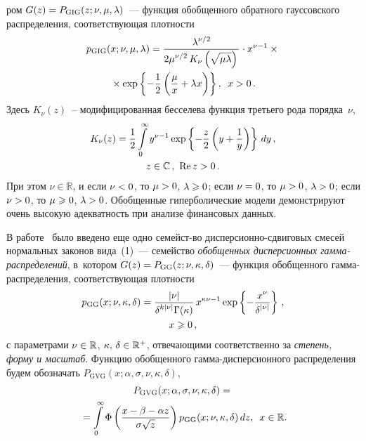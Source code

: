 \begin{multicols}{2}
\pagebreak

\noindent
ром $G(z)\hm=P_{\mathrm{GIG}}(z;\nu,\mu,\lambda)$~---
функция обобщенного обратного гауссовского распределения,
соответствующая плотности
\begin{multline*}
p_{\mathrm{GIG}}(x;\nu,\mu,\lambda)=\displaystyle\frac{\displaystyle \lambda^{\nu/2}\mathstrut}{\displaystyle 2\mu^{\nu/2}\,
K_{\nu}\left(\sqrt{\mu\lambda}\right)\mathstrut}\cdot
x^{\nu-1}\times{}\\
{}\times\exp\left\{-\displaystyle\frac{\displaystyle 1\mathstrut}{\displaystyle 2\mathstrut}\left(\displaystyle\frac{\displaystyle \mu\mathstrut}{\displaystyle x\mathstrut}+\lambda
x\right)\right\},\enskip x>0\,.
\end{multline*}
Здесь $K_{\nu}(z)$~-- модифицированная бесселева функция третьего
рода порядка~$\nu$,
\begin{multline*}
K_{\nu}(z)=\displaystyle\frac{\displaystyle 1\mathstrut}{\displaystyle 2\mathstrut}\int\limits_{0}^{\infty}
y^{\nu-1}\exp\left\{-\displaystyle\frac{\displaystyle z\mathstrut}{\displaystyle 2\mathstrut}\left(y+\displaystyle\frac{\displaystyle 1\mathstrut}{\displaystyle y\mathstrut}\right)\right\}\,dy\,,\\
z\in\mathbb{C}\,,\ \mathrm{Re}\,z>0\,.
\end{multline*}
При этом $\nu\in\mathbb{R}$, и если $\nu\hm<0$, то $\mu\hm>0$, $\lambda\hm\geqslant0$; если
$\nu\hm=0$, то $\mu\hm>0$, $\lambda\hm>0$; если $\nu\hm>0$, то $\mu\hm\geqslant0$,
$\lambda\hm>0$. Обобщенные гиперболические модели демонстрируют очень
высокую адекватность при анализе финансовых данных.

В работе~\cite{KorolevSokolov2012} было введено еще одно семейст-\linebreak во
дис\-пер\-си\-он\-но-сдви\-го\-вых смесей нормальных \mbox{законов} вида~(1)~---
семейство {\it обобщенных дис\-пер\-си\-он\-ных гам\-ма-рас\-пре\-де\-ле\-ний}, 
в~котором $G(z)\hm=P_{\mathrm{GG}}(z;\nu,\kappa,\delta)$~--- функция обобщенного
гам\-ма-рас\-пре\-де\-ле\-ния, соответствующая плот\-ности
\begin{multline}
p_{\mathrm{GG}}(x;\nu,\kappa,\delta)=\displaystyle\frac{\displaystyle |\nu|\mathstrut}{\displaystyle \delta^{k|\nu|}\Gamma(\kappa)\mathstrut}\,
x^{\kappa\nu-1}\exp\left\{-\displaystyle\frac{\displaystyle x^{\nu}\mathstrut}{\displaystyle \delta^{|\nu|}\mathstrut}\right\}\,,\\
 x\geqslant0\,,
 \label{e2-kk}
\end{multline}
с параметрами $\nu\hm\in\mathbb{R}$,  $\kappa,\,\delta\hm\in{\mathbb R}^+$,
отвечающими соответственно за {\it степень, форму и масштаб}.
Функцию обобщенного гам\-ма-дис\-пер\-си\-он\-но\-го распределения будем
обозначать $P_{\mathrm{GVG}}(x;\alpha,\sigma,\nu,\kappa,\delta)$,
\begin{multline}
P_{\mathrm{GVG}}(x;\alpha,\sigma,\nu,\kappa,\delta)={}\\
\hspace*{-2mm}{}=
\int\limits_{0}^{\infty}\Phi\left(\fr{x-\beta-\alpha
z}{\sigma\sqrt{z}}\right)p_{\mathrm{GG}}(x;\nu,\kappa,\delta)\,dz,\enskip
x\in\mathbb{R}.\!\!\!\!
\label{e3-kk}
\end{multline}


\end{multicols}
